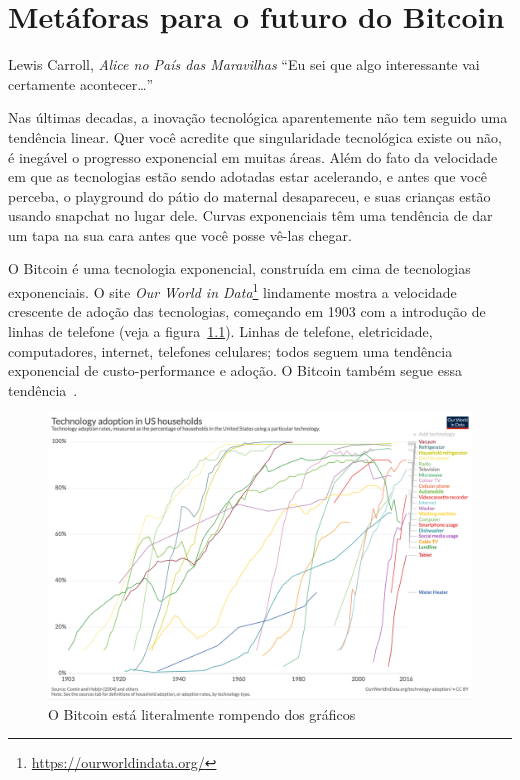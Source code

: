 \chapter{Metáforas para o futuro do Bitcoin}
\label{les:21}

\begin{chapquote}{Lewis Carroll, \textit{Alice no País das Maravilhas}}
\enquote{Eu sei que algo interessante vai certamente acontecer\ldots}
\end{chapquote}

Nas últimas decadas, a inovação tecnológica aparentemente não tem seguido 
uma tendência linear. Quer você acredite que singularidade tecnológica existe 
ou não, é inegável o progresso exponencial em muitas áreas. Além do fato da velocidade 
em que as tecnologias estão sendo adotadas estar acelerando, e antes 
que você perceba, o playground do pátio do maternal desapareceu, e suas 
crianças estão usando snapchat no lugar dele. Curvas exponenciais têm uma 
tendência de dar um tapa na sua cara antes que você posse vê-las chegar.

O Bitcoin é uma tecnologia exponencial, construída em cima de tecnologias exponenciais.
O site \textit{Our World in Data}\footnote{\url{https://ourworldindata.org/}}
lindamente mostra a velocidade crescente de adoção das tecnologias, começando em 1903
com a introdução de linhas de telefone (veja a figura~\ref{fig:tech-adoption}).
Linhas de telefone, eletricidade, computadores, internet, telefones celulares; 
todos seguem uma tendência exponencial de custo-performance e adoção. 
O Bitcoin também segue essa tendência~\cite{tech-adoption}.

\begin{figure}
  \includegraphics{assets/images/tech-adoption.png}
  \caption{O Bitcoin está literalmente rompendo dos gráficos}
  \label{fig:tech-adoption}
\end{figure}

